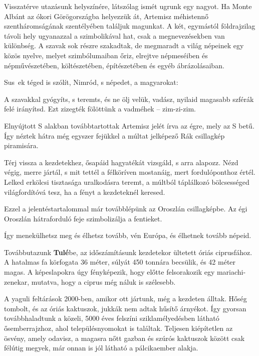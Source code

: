 \clearpage
Visszatérve utazásunk helyszínére, látszólag ismét ugrunk egy
nagyot. Ha Monte Albánt az ókori Görögországba helyezzük át,
Artemisz méhistennő szentháromságának szentélyében találjuk magunkat.
A két, egymástól földrajzilag távoli hely ugyanazzal a szimbolikával
hat, csak a megnevezésekben van különbség. A szavak sok
részre szakadtak, de megmaradt a világ népeinek egy közös nyelve,
melyet szimbólumaiban őriz, elrejtve népmeséiben és népművészetében,
költészetében, építészetében és egyéb ábrázolásaiban.

Sus~ek téged is szólít, Nimród, s népedet, a magyarokat:

\bigskip
\begin{itshape}
A szavakkal gyógyíts, s teremts, és ne ölj velük, vadász, nyilaid magasabb
szférák felé irányítsd. Ezt zizegték fölöttünk a vadméhek -- zim-zi-zim.
\end{itshape}
\bigskip

Elnyújtott S alakban továbbtartottak Artemisz jelét írva az égre,
mely az S betű. Így néztek hátra még egyszer fejükkel a múltat
jelképező Rák csillagkép piramisára.

\bigskip
\begin{itshape}
Térj vissza a kezdetekhez, ősapáid hagyatékát vizsgáld, s arra alapozz.
Nézd végig, merre jártál, s mit tettél a félköríven mostanáig, mert
fordulóponthoz értél. Lelked erkölcsi tisztasága uralkodásra teremt,
a múltból táplálkozó bölcsességed világfordítóvá tesz, ha a fényt
a kezdeteknél keresed.
\end{itshape}
\bigskip

Ezzel a jelentéstartalommal már továbblépünk az Oroszlán csillagképbe.
Az égi Oroszlán hátraforduló feje szimbolizálja a fentieket.

\bigskip
\begin{itshape}
Így menekülhetsz meg és élhetsz tovább, vén Európa, és élhetnek tovább
népeid.
\end{itshape}
\bigskip

Továbbutazunk \textbf{Tulé}be, az időszámításunk kezdetekor ültetett
óriás ciprusfához. A hatalmas fa körfogata 36 méter, súlyát 450 tonnára
becsülik, és 42 méter magas. A képeslapokra úgy fényképezik,
hogy előtte felsorakozik egy mariachi-zenekar, mutatva, hogy a ciprus
még náluk is szélesebb.

A yaguli feltárások 2000-ben, amikor ott jártunk, még a kezdeten
álltak. Hőség tombolt, és az óriás kaktuszok, jukkák nem adtak hűsítő
árnyékot. Így gyorsan továbbhaladtunk a közeli, 5000 éves felszíni
sziklamélyedésben látható ősemberrajzhoz, ahol településnyomokat is
találtak. Teljesen kiépítetlen az ösvény, amely odavisz, a magasra nőtt
gazban és szúrós kaktuszok között csak félútig megyek, már onnan is
jól látható a pálcikaember alakja.

